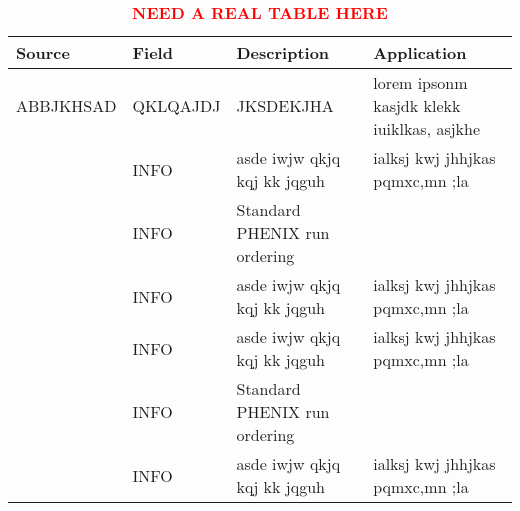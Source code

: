\begin{sidewaystable}
\centering
\begin{tabular}{ l l p{6cm} p{8cm} }
\toprule
\textbf{Source} & \textbf{Field} & \textbf{Description} & \textbf{Application} \\
\midrule 
ABBJKHSAD & QKLQAJDJ & JKSDEKJHA & lorem ipsonm kasjdk klekk iuiklkas, asjkhe  \\
 & INFO & asde iwjw qkjq kqj kk jqguh  & ialksj kwj jhhjkas pqmxc,mn ;la  \\
 & INFO & Standard PHENIX run ordering & \\
 & INFO & asde iwjw qkjq kqj kk jqguh  & ialksj kwj jhhjkas pqmxc,mn ;la  \\
 & INFO & asde iwjw qkjq kqj kk jqguh  & ialksj kwj jhhjkas pqmxc,mn ;la  \\
 & INFO & Standard PHENIX run ordering & \\
 & INFO & asde iwjw qkjq kqj kk jqguh  & ialksj kwj jhhjkas pqmxc,mn ;la  \\
\bottomrule
\end{tabular}
\caption{ \textbf{\textcolor{red}{NEED A REAL TABLE HERE}}}
\label{tab:sidewaystab}
\end{sidewaystable}
